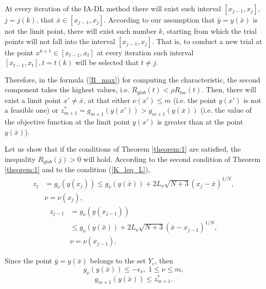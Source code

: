 \documentclass[twocolumn]{svjour3}          %
\begin{document}
	At every iteration of the IA-DL method there will exist such interval $[x_{j-1}, x_j]$, $j=j(k)$, that $\bar x \in [x_{j-1}, x_j]$. According to our assumption that $\bar y = y(\bar x)$ is not the limit point, there will exist such number $k$, starting from which the trial points will not fall into the interval $[x_{j-1}, x_j]$. That is, to conduct a new trial at the point $x^{k+1} \in [x_{t-1}, x_t]$ at every iteration such interval $[x_{t-1}, x_t], t=t(k)$ will be selected that $t \neq j$.

	Therefore, in the formula (\ref{R_max}) for computing the characteristic, the second component takes the highest values, i.e. $ R_{glob}(t) < \rho R_{loc}(t)$.
Then, there will exist a limit point $x' \neq \bar x$, at that either $\nu(x') \leq m$ (i.e. the point $y(x')$ is not a feasible one) or $z_{m+1}^\ast =g_{m+1}(y(x'))>g_{m+1}(y(\bar x))$ (i.e. the value of the objective function at the limit point $y(x')$ is greater than at the point $y(\bar x)$).

	Let us show that if the conditions of Theorem \ref{theorem:1} are satisfied, the inequality $R_{glob}(j)>0$ will hold. According to the second condition of Theorem \ref{theorem:1} and to the condition (\ref{K_leq_L}), 
\begin{align}
	z_j & = g_{\nu}\left( y(x_j) \right) \leq g_{\nu}\left( y(\bar x) \right) + 2L_{\nu}\sqrt{N+3}(x_j-\bar x)^{1/N}, \nonumber \\
	& \nu=\nu(x_j),
\end{align}
\begin{align}
	z_{j-1} &= g_{\nu}\left( y(x_{j-1}) \right) \nonumber \\
	& \leq g_{\nu}\left( y(\bar x) \right) + 2L_{\nu}\sqrt{N+3}(\bar x - x_{j-1})^{1/N}, \nonumber \\ 
	& \nu=\nu(x_{j-1}).
\end{align}

	Since the point $\bar y = y(\bar x)$ belongs to the set $Y_{\epsilon}$, then
$$
	g_{\nu}\left( y(\bar x) \right) \leq -\epsilon_{\nu}, \; 1\leq\nu\leq m,
$$
$$
	g_{m+1}\left( y(\bar x) \right) \leq z_{m+1}^\ast.
$$
\end{document}
